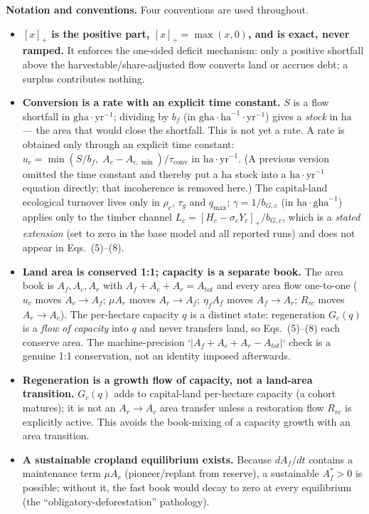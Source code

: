 \documentclass[11pt]{article}
\begin{document}
\textbf{Notation and conventions.} Four conventions are used throughout.

\begin{itemize}
\item \textbf{$[x]_+$ is the positive part, $[x]_+=\max(x,0)$, and is exact, never ramped.} It enforces the one-sided deficit mechanism: only a positive shortfall above the harvestable/share-adjusted flow converts land or accrues debt; a surplus contributes nothing.
\item \textbf{Conversion is a rate with an explicit time constant.} $S$ is a flow shortfall in $\text{gha}\cdot\text{yr}^{-1}$; dividing by $b_f$ (in $\text{gha}\cdot\text{ha}^{-1}\cdot\text{yr}^{-1}$) gives a \emph{stock} in $\text{ha}$ — the area that would close the shortfall. This is not yet a rate. A rate is obtained only through an explicit time constant: $u_c=\min\left(S/b_f,\;A_c-A_{c,\min}\right)/\tau_{\mathrm{conv}}$ in $\text{ha}\cdot\text{yr}^{-1}$. (A previous version omitted the time constant and thereby put a $\text{ha}$ stock into a $\text{ha}\cdot\text{yr}^{-1}$ equation directly; that incoherence is removed here.) The capital-land ecological turnover lives only in $\rho_c$, $\tau_g$ and $q_{\max}$; $\gamma=1/b_{G,c}$ (in $\text{ha}\cdot\text{gha}^{-1}$) applies only to the timber channel $L_c=[H_c-\sigma_c Y_c]_+/b_{G,c}$, which is a \emph{stated extension} (set to zero in the base model and all reported runs) and does not appear in Eqs.~(5)--(8).
\item \textbf{Land area is conserved 1:1; capacity is a separate book.} The area book is $A_f,A_c,A_r$ with $A_f+A_c+A_r=A_{tot}$ and every area flow one-to-one ($u_c$ moves $A_c\to A_f$; $\mu A_r$ moves $A_r\to A_f$; $\eta_f A_f$ moves $A_f\to A_r$; $R_{rc}$ moves $A_r\to A_c$). The per-hectare capacity $q$ is a distinct state: regeneration $G_c(q)$ is a \emph{flow of capacity} into $q$ and never transfers land, so Eqs.~(5)--(8) each conserve area. The machine-precision `$|A_f+A_c+A_r-A_{tot}|$` check is a genuine 1:1 conservation, not an identity imposed afterwards.
\item \textbf{Regeneration is a growth flow of capacity, not a land-area transition.} $G_c(q)$ adds to capital-land per-hectare capacity (a cohort matures); it is not an $A_r\to A_c$ area transfer unless a restoration flow $R_{rc}$ is explicitly active. This avoids the book-mixing of a capacity growth with an area transition.
\item \textbf{A sustainable cropland equilibrium exists.} Because $dA_f/dt$ contains a maintenance term $\mu A_r$ (pioneer/replant from reserve), a sustainable $A_f^*>0$ is possible; without it, the fast book would decay to zero at every equilibrium (the ``obligatory-deforestation'' pathology).

\end{itemize}
\end{document}
